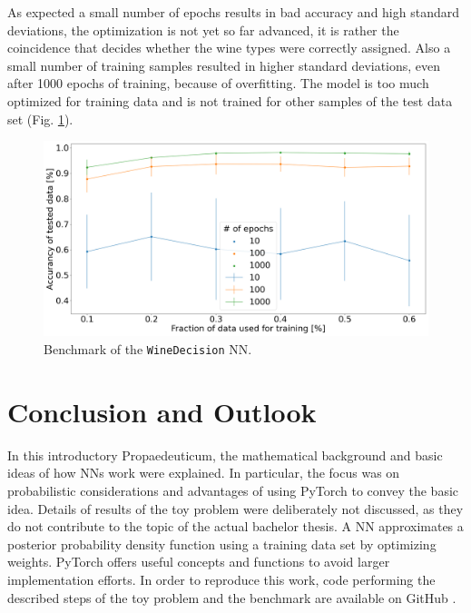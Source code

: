 As expected a small number of epochs results in bad accuracy and high standard deviations, the optimization is not yet so far advanced, it is rather the coincidence that decides whether the wine types were correctly assigned. Also a small number of training samples resulted in higher standard deviations, even after 1000 epochs of training, because of overfitting. The model is too much optimized for training data and is not trained for other samples of the test data set (Fig. \ref{fig:benchmark_nn}).

\begin{figure}
	\centering
	\includegraphics[width=\textwidth]{images/benchmark_nn.png}
\caption{Benchmark of the \texttt{WineDecision} NN.}
\label{fig:benchmark_nn}
\end{figure}

\section{Conclusion and Outlook}
In this introductory Propaedeuticum, the mathematical background and basic ideas of how NNs work were explained. In particular, the focus was on probabilistic considerations and advantages of using PyTorch to convey the basic idea. Details of results of the toy problem were deliberately not discussed, as they do not contribute to the topic of the actual bachelor thesis.
A NN approximates a posterior probability density function using a training data set by optimizing weights. PyTorch offers useful concepts and functions to avoid larger implementation efforts. In order to reproduce this work, code performing the described steps of the toy problem and the benchmark are available on GitHub \cite{Wine-Mining}.